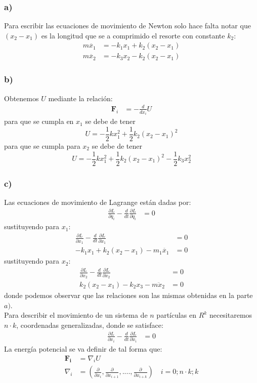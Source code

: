\documentclass{article}
\begin{document}
\begin{tcolorbox}[breakable]
    \subsubsection*{a)}
    Para escribir las ecuaciones de movimiento de Newton solo hace falta notar que 
    $(x_2-x_1)$ es la longitud que se a comprimido el resorte con constante $k_2$:
    \begin{align*}
        m\ddot{x_1} &= -k_1x_1 + k_2(x_2-x_1) \\
        m\ddot{x_2} &= -k_3x_2 - k_2(x_2-x_1)
    \end{align*}
    \subsubsection*{b)}
    Obtenemos $U$ mediante la relación:
    \begin{align*}
        \bm{F}_i &= -\frac{d}{dx_i}U
    \end{align*}
    para que se cumpla en $x_1$ se debe de tener 
    \[U = -\frac{1}{2}kx_1^2+\frac{1}{2}k_2(x_2-x_1)^2\]
    para  que se cumpla para $x_2$ se debe de tener 
    \[U = -\frac{1}{2}kx_1^2+\frac{1}{2}k_2(x_2-x_1)^2-\frac{1}{2}k_3x_2^2 \]
    \subsubsection*{c)}
    Las ecuaciones de movimiento de Lagrange están dadas por:
    \begin{align*}
        \frac{\partial L}{\partial q_i} - \frac{d}{dt}\frac{\partial L }{\partial \dot{q}_i} &= 0 
    \end{align*}
    sustituyendo para $x_1$:
    \begin{align*}
        \frac{\partial L}{\partial x_1} - \frac{d}{dt}\frac{\partial L }{\partial \dot{x}_1} &= 0 \\
        -k_1x_1+k_2(x_2-x_1) - m_1\ddot{x_1} &= 0  
    \end{align*}
    sustituyendo para $x_2$:
    \begin{align*}
        \frac{\partial L}{\partial x_2} - \frac{d}{dt}\frac{\partial L }{\partial \dot{x}_2} &= 0 \\
        k_2(x_2-x_1)-k_2x_3 - m\ddot{x}_2 &= 0 
    \end{align*}
    donde podemos observar que las relaciones son las mismas obtenidas en la parte $a)$. \\
    Para describir el movimiento de un sistema de $n$ partículas en $R^k$ necesitaremos $n \cdot k$,
    coordenadas generalizadas, donde se satisface:
    \begin{align*}
        \frac{\partial L}{\partial x_i} - \frac{d}{dt}\frac{\partial L }{\partial \dot{x}_i} &= 0 
    \end{align*}
    La energía potencial se va definir de tal forma que:
    \begin{align*}
        \bm{F_i} &= \nabla_i U \\
        \nabla_i &= \left( \frac{\partial }{\partial x_i}, \frac{\partial }{\partial x_{i+1}}, ...., \frac{\partial }{\partial x_{i+k}} \right) \quad i=0;n \cdot k;k
    \end{align*}
    
\end{tcolorbox}
\end{document}
